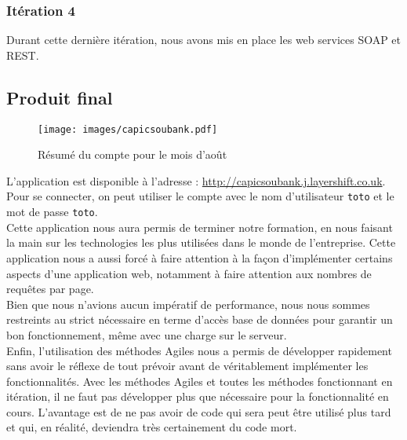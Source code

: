 \subsubsection{Itération 4}

Durant cette dernière itération, nous avons mis en place les web services SOAP et REST.

\subsection{Produit final}

\begin{figure}[H]
	\centering
	\texttt{[image: images/capicsoubank.pdf]}
	\caption{Résumé du compte pour le mois d'août}
\end{figure}

L'application est disponible à l'adresse : \url{http://capicsoubank.j.layershift.co.uk}. Pour se connecter, on peut utiliser le compte avec le nom d'utilisateur \verb+toto+ et le mot de passe \verb+toto+.\\

Cette application nous aura permis de terminer notre formation, en nous faisant la main sur les technologies les plus utilisées dans le monde de l'entreprise. Cette application nous a aussi forcé à faire attention à la façon d'implémenter certains aspects d'une application web, notamment à faire attention aux nombres de requêtes par page.\\

Bien que nous n'avions aucun impératif de performance, nous nous sommes restreints au strict nécessaire en terme d'accès base de données pour garantir un bon fonctionnement, même avec une charge sur le serveur.\\

Enfin, l'utilisation des méthodes Agiles nous a permis de développer rapidement sans avoir le réflexe de tout prévoir avant de véritablement implémenter les fonctionnalités. Avec les méthodes Agiles et toutes les méthodes fonctionnant en itération, il ne faut pas développer plus que nécessaire pour la fonctionnalité en cours. L'avantage est de ne pas avoir de code qui sera peut être utilisé plus tard et qui, en réalité, deviendra très certainement du code mort.
